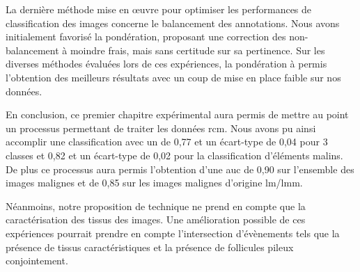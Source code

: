 La dernière méthode mise en œuvre pour optimiser les performances de classification des images concerne le balancement des annotations. Nous avons initialement favorisé la pondération, proposant une correction des non-balancement à moindre frais, mais sans certitude sur sa pertinence. Sur les diverses méthodes évaluées lors de ces expériences, la pondération à permis l'obtention des meilleurs résultats avec un coup de mise en place faible sur nos données.\par

En conclusion, ce premier chapitre expérimental aura permis de mettre au point un processus permettant de traiter les données \gls{rcm}. Nous avons pu ainsi accomplir une classification avec un \fscore{} de 0,77 et un écart-type de 0,04 pour 3 classes et 0,82 et un écart-type de 0,02 pour la classification d'éléments malins. De plus ce processus aura permis l'obtention d'une \gls{auc} de 0,90 sur l'ensemble des images malignes et de 0,85 sur les images malignes d'origine \gls{lm}/\gls{lmm}.\par

Néanmoins, notre proposition de technique ne prend en compte que la caractérisation des tissus des images. Une amélioration possible de ces expériences pourrait prendre en compte l'intersection d'évènements tels que la présence de tissus caractéristiques et la présence de follicules pileux conjointement.\par
